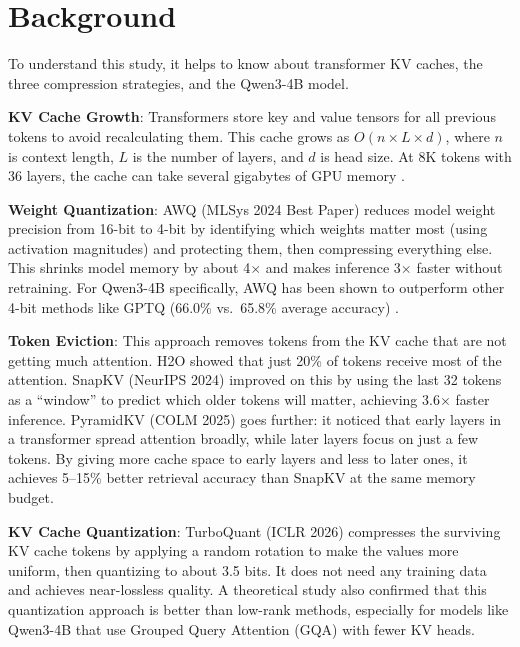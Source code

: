 \documentclass[conference]{IEEEtran}
\begin{document}
\section{Background}

To understand this study, it helps to know about transformer KV caches, the three compression strategies, and the Qwen3-4B model.

\textbf{KV Cache Growth}: Transformers store key and value tensors for all previous tokens to avoid recalculating them. This cache grows as $O(n \times L \times d)$, where $n$ is context length, $L$ is the number of layers, and $d$ is head size. At 8K tokens with 36 layers, the cache can take several gigabytes of GPU memory \cite{snapkv}.

\textbf{Weight Quantization}: AWQ \cite{awq} (MLSys 2024 Best Paper) reduces model weight precision from 16-bit to 4-bit by identifying which weights matter most (using activation magnitudes) and protecting them, then compressing everything else. This shrinks model memory by about 4$\times$ and makes inference 3$\times$ faster without retraining. For Qwen3-4B specifically, AWQ has been shown to outperform other 4-bit methods like GPTQ (66.0\% vs.\ 65.8\% average accuracy) \cite{qwen3quant2025}.

\textbf{Token Eviction}: This approach removes tokens from the KV cache that are not getting much attention. H2O \cite{h2o} showed that just 20\% of tokens receive most of the attention. SnapKV \cite{snapkv} (NeurIPS 2024) improved on this by using the last 32 tokens as a ``window'' to predict which older tokens will matter, achieving 3.6$\times$ faster inference. PyramidKV \cite{pyramidkv} (COLM 2025) goes further: it noticed that early layers in a transformer spread attention broadly, while later layers focus on just a few tokens. By giving more cache space to early layers and less to later ones, it achieves 5--15\% better retrieval accuracy than SnapKV at the same memory budget.

\textbf{KV Cache Quantization}: TurboQuant \cite{turboquant} (ICLR 2026) compresses the surviving KV cache tokens by applying a random rotation to make the values more uniform, then quantizing to about 3.5 bits. It does not need any training data and achieves near-lossless quality. A theoretical study \cite{salfati2026} also confirmed that this quantization approach is better than low-rank methods, especially for models like Qwen3-4B that use Grouped Query Attention (GQA) with fewer KV heads.
\end{document}
